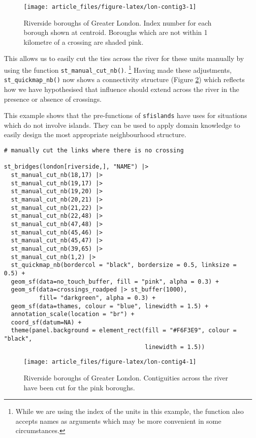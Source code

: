 \begin{figure}

{\centering \texttt{[image: article\_files/figure-latex/lon-contig3-1]} 

}

\caption{Riverside boroughs of Greater London. Index number for each borough shown at centroid. Boroughs which are not within 1 kilometre of a crossing are shaded pink. }\label{fig:lon-contig3}
\end{figure}

This allows us to easily cut the ties across the river for these units
manually by using the function \texttt{st\_manual\_cut\_nb()}. \footnote{While we are using the index of the units in this example, the function also
  accepts names as arguments which may be more convenient in some circumstances.} Having made these adjustments,
\texttt{st\_quickmap\_nb()} now shows a connectivity structure (Figure \ref{fig:lon-contig4}) which reflects how we have hypothesised that influence should extend across the river in the presence or absence of crossings.

This example shows that the pre-functions of \texttt{sfislands} have uses for situations which do not involve islands. They can be used to apply domain knowledge to easily design the most appropriate neighbourhood structure.

\begin{verbatim}
# manually cut the links where there is no crossing

st_bridges(london[riverside,], "NAME") |> 
  st_manual_cut_nb(18,17) |> 
  st_manual_cut_nb(19,17) |> 
  st_manual_cut_nb(19,20) |> 
  st_manual_cut_nb(20,21) |> 
  st_manual_cut_nb(21,22) |> 
  st_manual_cut_nb(22,48) |> 
  st_manual_cut_nb(47,48) |> 
  st_manual_cut_nb(45,46) |> 
  st_manual_cut_nb(45,47) |>  
  st_manual_cut_nb(39,65) |> 
  st_manual_cut_nb(1,2) |> 
  st_quickmap_nb(bordercol = "black", bordersize = 0.5, linksize = 0.5) +
  geom_sf(data=no_touch_buffer, fill = "pink", alpha = 0.3) + 
  geom_sf(data=crossings_roadped |> st_buffer(1000), 
          fill= "darkgreen", alpha = 0.3) +
  geom_sf(data=thames, colour = "blue", linewidth = 1.5) +
  annotation_scale(location = "br") +
  coord_sf(datum=NA) + 
  theme(panel.background = element_rect(fill = "#F6F3E9", colour = "black", 
                                        linewidth = 1.5))
\end{verbatim}

\begin{figure}

{\centering \texttt{[image: article\_files/figure-latex/lon-contig4-1]} 

}

\caption{Riverside boroughs of Greater London. Contiguities across the river have been cut for the pink boroughs. }\label{fig:lon-contig4}
\end{figure}

